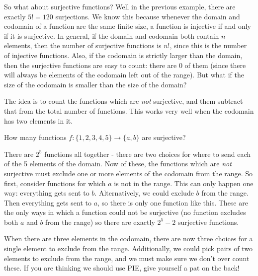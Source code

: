 \documentclass[12pt]{article}
\begin{document}
So what about surjective functions?  Well in the previous example, there are exactly $5! = 120$ surjections.  We know this because whenever the domain and codomain of a function are the same finite size, a function is injective if and only if it is surjective.  In general, if the domain and codomain both contain $n$ elements, then the number of surjective functions is $n!$, since this is the number of injective functions.  Also, if the codomain is strictly larger than the domain, then the surjective functions are easy to count: there are 0 of them (since there will always be elements of the codomain left out of the range).  But what if the size of the codomain is smaller than the size of the domain?

The idea is to count the functions which are {\em not} surjective, and them subtract that from the total number of functions.  This works very well when the codomain has two elements in it.

\begin{example}
  How many functions $f: \{1,2,3,4,5\} \to \{a,b\}$ are surjective?
  \begin{solution}
    There are $2^5$ functions all together - there are two choices for where to send each of the 5 elements of the domain.  Now of these, the functions which are {\em not} surjective must exclude one or more elements of the codomain from the range.  So first, consider functions for which $a$ is not in the range.  This can only happen one way: everything gets sent to $b$.  Alternatively, we could exclude $b$ from the range.  Then everything gets sent to $a$, so there is only one function like this.  These are the only ways in which a function could not be surjective (no function excludes both $a$ and $b$ from the range) so there are exactly $2^5 - 2$ surjective functions.
  \end{solution}
\end{example}

When there are three elements in the codomain, there are now three choices for a single element to exclude from the range.  Additionally, we could pick pairs of two elements to exclude from the range, and we must make sure we don't over count these.  If you are thinking we should use PIE, give yourself a pat on the back!
\end{document}
